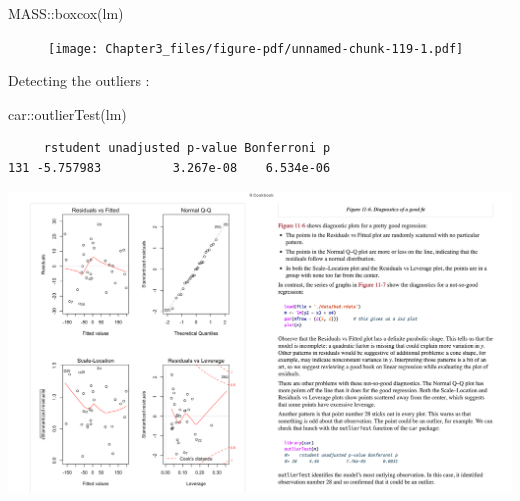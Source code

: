 \documentclass[
  letterpaper,
  DIV=11,
  numbers=noendperiod]{scrreprt}
\newenvironment{Shaded}{\begin{snugshade}}{\end{snugshade}}
\newcommand{\FunctionTok}[1]{\textcolor[rgb]{0.02,0.16,0.49}{#1}}
\newcommand{\NormalTok}[1]{\textcolor[rgb]{0.33,0.33,0.33}{#1}}
\newcommand{\SpecialCharTok}[1]{\textcolor[rgb]{0.00,0.46,0.62}{#1}}
\begin{document}
\begin{Shaded}
\begin{Highlighting}[]
\NormalTok{MASS}\SpecialCharTok{::}\FunctionTok{boxcox}\NormalTok{(lm)}
\end{Highlighting}
\end{Shaded}

\begin{figure}[H]

{\centering \texttt{[image: Chapter3\_files/figure-pdf/unnamed-chunk-119-1.pdf]}

}

\end{figure}

Detecting the outliers :

\begin{Shaded}
\begin{Highlighting}[]
\NormalTok{car}\SpecialCharTok{::}\FunctionTok{outlierTest}\NormalTok{(lm)}
\end{Highlighting}
\end{Shaded}

\begin{verbatim}
     rstudent unadjusted p-value Bonferroni p
131 -5.757983          3.267e-08    6.534e-06
\end{verbatim}

\includegraphics{rcook1.png}
\end{document}
